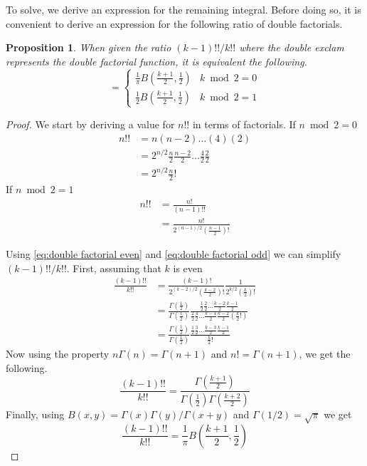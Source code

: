 \documentclass{article}
\newtheorem{proposition}{Proposition}
\begin{document}
To solve, we derive an expression for the remaining integral. Before doing so, it is convenient to derive an expression for the following
ratio of double factorials.
\begin{proposition} \label{prop:double fac beta}
	When given the ratio $(k-1)!!/k!!$ where the double exclam represents the double factorial function, it is equivalent the following.
	\begin{equation}
		= \begin{cases}
			\frac{1}{\pi}B(\frac{k+1}{2}, \frac{1}{2}) & k\bmod 2=0\\
			\frac{1}{2}B(\frac{k+1}{2}, \frac{1}{2}) & k\bmod 2=1
		\end{cases}
	\end{equation}
\end{proposition}
\begin{proof}
	We start by deriving a value for $n!!$ in terms of factorials. If $n\bmod 2 = 0$
	\begin{align}
		n!! &= n(n-2)\hdots(4)(2) \\
		&= 2^{n/2}\frac{n}{2}\frac{n-2}{2}\hdots\frac{4}{2}\frac{2}{2} \\
		&= 2^{n/2}\frac{n}{2}! \label{eq:double factorial even}
	\end{align}
	If $n\bmod 2= 1$
	\begin{align}
		n!! &= \frac{n!}{(n-1)!!} \\
		&= \frac{n!}{2^{(n-1)/2}(\frac{n-1}{2})!} \label{eq:double factorial odd}
	\end{align}

	Using \ref{eq:double factorial even} and \ref{eq:double factorial odd} we can simplify $(k-1)!!/k!!$. First, assuming that $k$ is even
	\begin{align}
		\frac{(k-1)!!}{k!!} &= \frac{(k-1)!}{2^{(k-2)/2}(\frac{k-2}{2})!}\frac{1}{2^{k/2}(\frac{k}{2})!} \\
		&= \frac{\Gamma(\frac{1}{2})}{\Gamma(\frac{1}{2})}\frac{\frac{1}{2}\frac{2}{2}\hdots\frac{k-2}{2}\frac{k-1}{2}}{\frac{2}{2}\frac{4}{2}\hdots\frac{k-4}{2}\frac{k-2}{2}(\frac{k}{2}!)} \\
		&= \frac{\Gamma(\frac{1}{2})}{\Gamma(\frac{1}{2})}\frac{\frac{1}{2}\frac{3}{2}\hdots\frac{k-3}{2}\frac{k-1}{2}}{\frac{k}{2}!}
	\end{align}
	Now using the property $n\Gamma(n)=\Gamma(n+1)$ and $n! = \Gamma(n+1)$, we get the following.
	\begin{equation}
		\frac{(k-1)!!}{k!!} = \frac{\Gamma(\frac{k+1}{2})}{\Gamma(\frac{1}{2})\Gamma(\frac{k+2}{2})}
	\end{equation}
	Finally, using $B(x,y)=\Gamma(x)\Gamma(y)/\Gamma(x+y)$ and $\Gamma(1/2) = \sqrt{\pi}$ we get
	\begin{equation}
		\frac{(k-1)!!}{k!!} = \frac{1}{\pi}B\left(\frac{k+1}{2}, \frac{1}{2}\right)
	\end{equation}


\end{proof}
\end{document}
